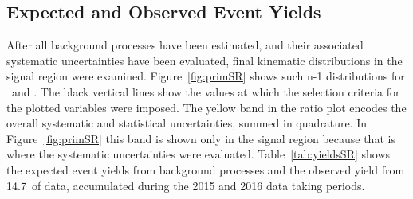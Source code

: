 \subsection{Expected and Observed Event Yields}
\par After all background processes have been estimated, and their associated systematic 
uncertainties have been evaluated, final kinematic distributions in the signal region were 
examined. Figure~\ref{fig:primSR} shows such n-1 distributions for \met\ and \mT. The black vertical 
lines show the values at which the selection criteria for the plotted variables were imposed.
 The yellow band in the ratio plot encodes the overall systematic and statistical uncertainties, 
summed in quadrature. In Figure~\ref{fig:primSR} this band is shown only in  
the signal region because that is where the systematic uncertainties were evaluated.        
Table~\ref{tab:yieldsSR} shows the expected event yields from background processes and 
the observed yield from 14.7~\ifb of data, accumulated during the 2015 and 2016 data taking 
periods. 

